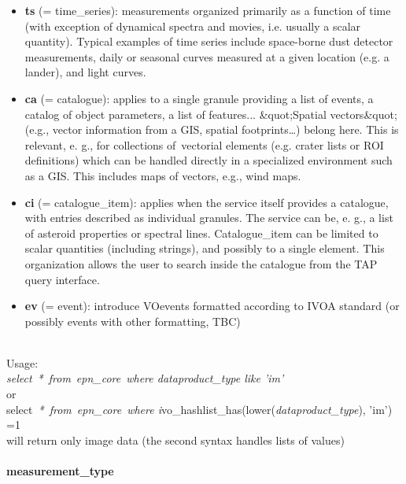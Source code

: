 \documentclass[11pt,a4paper]{ivoa}
\begin{document}
\begin{itemize}
\item \textbf{ts }(= time\_series): measurements organized primarily as a function of time (with exception of dynamical spectra and movies, i.e. usually a scalar quantity). Typical examples of time series include space-borne dust detector measurements, daily or seasonal curves measured at a given location (e.g. a lander), and light curves.
\item \textbf{ca }(= catalogue): applies to a single granule providing a list of events, a catalog of object parameters, a list of features... \&quot;Spatial vectors\&quot; (e.g., vector information from a GIS, spatial footprints…) belong here. This is relevant, e. g., for collections of vectorial elements (e.g. crater lists or ROI definitions) which can be handled directly in a specialized environment such as a GIS. This includes maps of vectors, e.g., wind maps.\\
\item \textbf{ci }(= catalogue\_item): applies when the service itself provides a catalogue, with entries described as individual granules. The service can be, e. g., a list of asteroid properties or spectral lines. Catalogue\_item can be limited to scalar quantities (including strings), and possibly to a single element. This organization allows the user to search inside the catalogue from the TAP query interface.
\item \textbf{ev} (= event): introduce VOevents formatted according to IVOA standard (or possibly events with other formatting, TBC)\\
\end{itemize}

\\

Usage:\\\emph{}\emph{}\emph{select} \emph{*} \emph{from} \emph{epn\_core} \emph{where dataproduct\_type like 'im'}\\or \\select \emph{*} \emph{from} \emph{epn\_core} \emph{where i}vo\_hashlist\_has(lower(\emph{dataproduct\_type}), 'im') =1\\ will return only image data (the second syntax handles lists of values)\\

\paragraph{measurement\_type}
\end{document}

